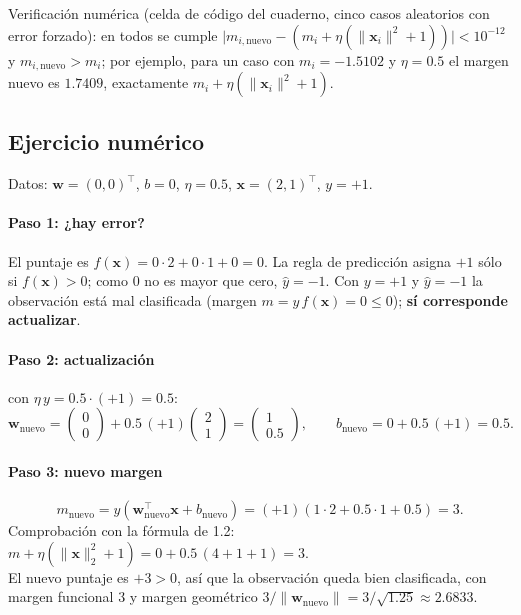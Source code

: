 \documentclass[11pt,a4paper]{article}
\newcommand{\x}{\mathbf{x}}
\newcommand{\w}{\mathbf{w}}
\newcommand{\yhat}{\hat y}
\begin{document}
Verificación numérica (celda de código del cuaderno, cinco casos aleatorios con
error forzado): en todos se cumple
$\lvert m_{i,\text{nuevo}} - (m_i + \eta(\lVert\x_i\rVert^2+1))\rvert < 10^{-12}$
y $m_{i,\text{nuevo}} > m_i$; por ejemplo, para un caso con
$m_i = -1.5102$ y $\eta = 0.5$ el margen nuevo es $1.7409$, exactamente
$m_i + \eta(\lVert \x_i\rVert^2+1)$.

\subsection{Ejercicio numérico}

Datos: $\w = (0,0)^\top$, $b = 0$, $\eta = 0.5$, $\x = (2,1)^\top$, $y = +1$.

\paragraph{Paso 1: ¿hay error?} El puntaje es
$f(\x) = 0\cdot 2 + 0\cdot 1 + 0 = 0$. La regla de predicción asigna $+1$ sólo si
$f(\x) > 0$; como $0$ no es mayor que cero, $\yhat = -1$. Con $y = +1$ y
$\yhat = -1$ la observación está mal clasificada (margen
$m = y\,f(\x) = 0 \le 0$); \textbf{sí corresponde actualizar}.

\paragraph{Paso 2: actualización} con $\eta\,y = 0.5\cdot(+1) = 0.5$:
\begin{equation}
\w_{\text{nuevo}} =
\begin{pmatrix} 0\\0\end{pmatrix}
+ 0.5\,(+1)\begin{pmatrix} 2\\1\end{pmatrix}
= \begin{pmatrix} 1\\0.5\end{pmatrix},
\qquad
b_{\text{nuevo}} = 0 + 0.5\,(+1) = 0.5 .
\end{equation}

\paragraph{Paso 3: nuevo margen}
\begin{equation}
m_{\text{nuevo}} = y\left(\w_{\text{nuevo}}^\top \x + b_{\text{nuevo}}\right)
= (+1)\left(1\cdot 2 + 0.5\cdot 1 + 0.5\right) = 3 .
\end{equation}
Comprobación con la fórmula de 1.2:
$m + \eta(\lVert \x\rVert_2^2 + 1) = 0 + 0.5\,(4+1+1) = 3$. \checkmark\\
El nuevo puntaje es $+3 > 0$, así que la observación queda bien clasificada, con
margen funcional $3$ y margen geométrico
$3/\lVert \w_{\text{nuevo}}\rVert = 3/\sqrt{1.25} \approx 2.6833$.
\end{document}
